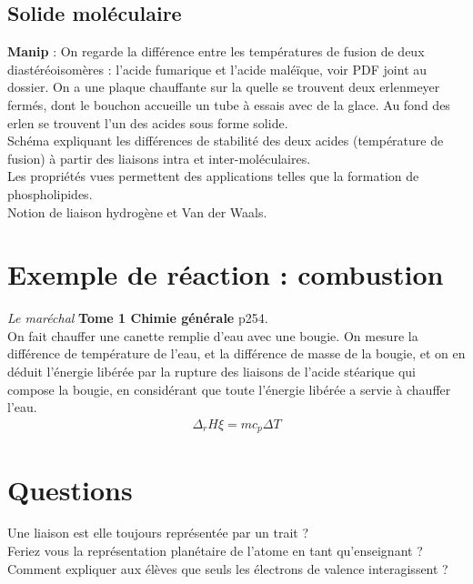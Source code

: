 \documentclass[12pt,prb,aps,epsf]{article}
\begin{document}
\subsection{Solide moléculaire}
\textbf{Manip} : On regarde la différence entre les températures de fusion de deux diastéréoisomères : l'acide fumarique et l'acide maléïque, voir PDF joint au dossier. On a une plaque chauffante sur la quelle se trouvent deux erlenmeyer fermés, dont le bouchon accueille un tube à essais avec de la glace. Au fond des erlen se trouvent l'un des acides sous forme solide.\\

Schéma expliquant les différences de stabilité des deux acides (température de fusion) à partir des liaisons intra et inter-moléculaires.\\

Les propriétés vues permettent des applications telles que la formation de phospholipides.\\

Notion de liaison hydrogène et Van der Waals.

\section{Exemple de réaction : combustion}
\textit{Le maréchal} \textbf{Tome 1 Chimie générale} p254.\\

On fait chauffer une canette remplie d'eau avec une bougie. On mesure la différence de température de l'eau, et la différence de masse de la bougie, et on en déduit l'énergie libérée par la rupture des liaisons de l'acide stéarique qui compose la bougie, en considérant que toute l'énergie libérée a servie à chauffer l'eau.
	\begin{eqnarray}
	\Delta_rH \xi = mc_p \Delta T
	\end{eqnarray}
	
\section*{Questions}
Une liaison est elle toujours représentée par un trait ?\\

Feriez vous la représentation planétaire de l'atome en tant qu'enseignant ?\\

Comment expliquer aux élèves que seuls les électrons de valence interagissent ?\\
\end{document}
